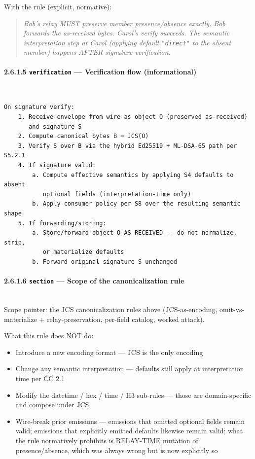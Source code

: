 \documentclass[11pt]{article}
\begin{document}
With the rule (explicit, normative):


\begin{quote}\itshape Bob's relay MUST preserve member presence/absence exactly. Bob forwards the as-received bytes. Carol's verify succeeds. The semantic interpretation step at Carol (applying default \texttt{"direct"} to the absent member) happens AFTER signature verification.\end{quote}


\paragraph{2.6.1.5 \texttt{verification} — Verification flow (informational)}\mbox{}\\


\begin{lstlisting}
On signature verify:
    1. Receive envelope from wire as object O (preserved as-received)
       and signature S
    2. Compute canonical bytes B = JCS(O)
    3. Verify S over B via the hybrid Ed25519 + ML-DSA-65 path per S5.2.1
    4. If signature valid:
        a. Compute effective semantics by applying S4 defaults to absent
           optional fields (interpretation-time only)
        b. Apply consumer policy per S8 over the resulting semantic shape
    5. If forwarding/storing:
        a. Store/forward object O AS RECEIVED -- do not normalize, strip,
           or materialize defaults
        b. Forward original signature S unchanged
\end{lstlisting}

\paragraph{2.6.1.6 \texttt{section} — Scope of the canonicalization rule}\mbox{}\\


Scope pointer: the JCS canonicalization rules above (JCS-as-encoding, omit-vs-materialize + relay-preservation, per-field catalog, worked attack).


What this rule does NOT do:

\begin{itemize}\setlength\itemsep{0pt}
\item Introduce a new encoding format — JCS is the only encoding
\item Change any semantic interpretation — defaults still apply at interpretation time per CC 2.1
\item Modify the datetime / hex / time / H3 sub-rules — those are domain-specific and compose under JCS
\item Wire-break prior emissions — emissions that omitted optional fields remain valid; emissions that explicitly emitted defaults likewise remain valid; what the rule normatively prohibits is RELAY-TIME mutation of presence/absence, which was always wrong but is now explicitly so
\end{itemize}
\end{document}
